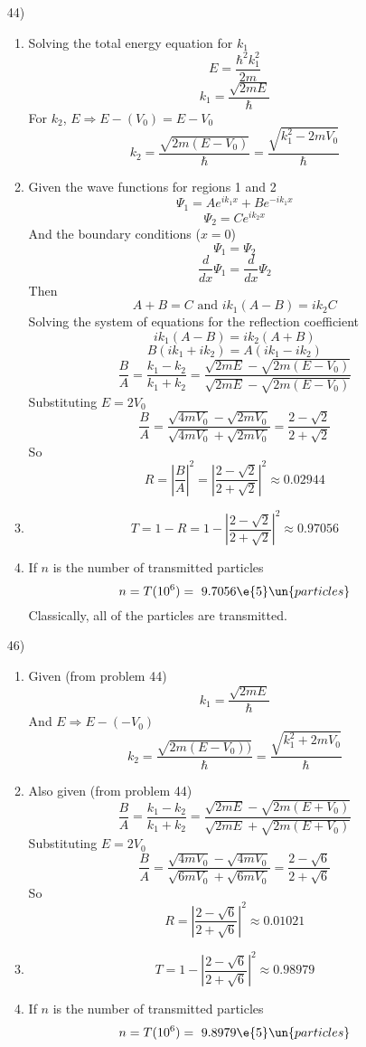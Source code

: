 \documentclass[12pt]{2620hw}
\begin{document}
\maketitle

\begin{enumerate}

\item [44)]
\begin{enumerate}
    \item Solving the total energy equation for $k_1$ 
	\[
		E = \frac{\hbar^2 k_1^2}{2m}
	\]
	\[
		k_1 = \frac{\sqrt{2mE}}{\hbar}
	\]
	For $k_2$, $E \Rightarrow E-(V_0) = E-V_0$
	\[
		k_2 = \frac{\sqrt{2m(E-V_0)}}{\hbar} =  \frac{\sqrt{ k_1^2 - 2mV_0 }}{\hbar}
	\]
	\item Given the wave functions for regions 1 and 2
	\[
		\Psi_1 = Ae^{ik_1x} + Be^{-ik_1x}
	\]
	\[
		\Psi_2 = Ce^{ik_2x}
	\]
	And the boundary conditions ($x =0 $) 
	\[
		\Psi_1 = \Psi_2
	\]
	\[
		\frac{d}{dx}\Psi_1 = \frac{d}{dx}\Psi_2
	\] 
	Then 
	\[
		A + B = C \text{ and } ik_1(A - B) = ik_2C
	\]
	Solving the system of equations for the reflection coefficient 
	\[
		ik_1(A - B) = ik_2(A+B)
	\]
	\[
		B(ik_1+ik_2) = A(ik_1-ik_2) 
	\]
	\[
		\frac{B}{A} = \frac{k_1-k_2}{k_1+k_2} = \frac{\sqrt{2mE} - \sqrt{2m(E-V_0)}}{\sqrt{2mE} - \sqrt{2m(E-V_0)}}
	\]
	Substituting $E = 2V_0$
	\[
		\frac{B}{A} = \frac{\sqrt{4mV_0} - \sqrt{2mV_0}}{\sqrt{4mV_0} + \sqrt{2mV_0}} = \frac{2-\sqrt{2}}{2 +\sqrt{2}}
	\]
	So
	\[
		R = \left| \frac{B}{A}\right|^2 = \left| \frac{2-\sqrt{2}}{2+\sqrt{2}} \right|^2 \approx 0.02944
	\]
	\item	
	\[
		T = 1 - R = 1- \left| \frac{2-\sqrt{2}}{2+\sqrt{2}} \right|^2 \approx 0.97056 
	\]
	\item If $n$ is the number of transmitted particles
	\[
		n = T(10^6) =  9.7056\e{5}\un{particles}
	\]
	Classically, all of the particles are transmitted.
	
\end{enumerate}

\item [46)]
\begin{enumerate}
    \item Given (from problem 44)
	\[
		k_1 = \frac{\sqrt{2mE}}{\hbar}
	\]
	And $E \Rightarrow E - (-V_0)$
	\[
		k_2 = \frac{\sqrt{2m(E-V_0))}}{\hbar} = \frac{\sqrt{k_1^2 + 2mV_0}}{\hbar}
	\]
	\item Also given (from problem 44)
	\[
		\frac{B}{A} = \frac{k_1-k_2}{k_1+k_2} = \frac{\sqrt{2mE} - \sqrt{2m(E+V_0)}}{\sqrt{2mE} + \sqrt{2m(E+V_0)}}	
	\]
	Substituting $E = 2V_0$
	\[
		\frac{B}{A} = \frac{\sqrt{4mV_0} - \sqrt{4mV_0}}{\sqrt{6mV_0} + \sqrt{6mV_0}} = \frac{2-\sqrt{6}}{2 +\sqrt{6}}
	\]
	So 
	\[
		R =  \left| \frac{2-\sqrt{6}}{2+\sqrt{6}} \right|^2 \approx 0.01021
	\]
	\item	
	\[
		T = 1- \left| \frac{2-\sqrt{6}}{2+\sqrt{6}} \right|^2 \approx 0.98979	
	\]
	\item If $n$ is the number of transmitted particles
	\[
		n = T(10^6) =  9.8979\e{5}\un{particles}	
	\]
\end{enumerate}


\end{enumerate}
\end{document}
